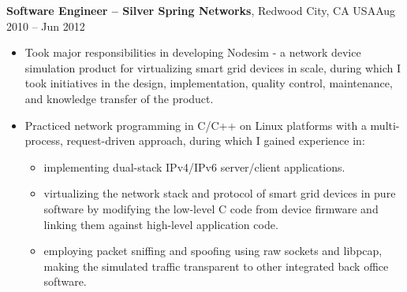\documentclass[margin,line]{res}
\begin{document}
\begin{resume}
  {\bf Software Engineer -- Silver Spring Networks}, Redwood City, CA USA\hfill Aug 2010 -- Jun 2012
  \vspace{.05in}
  \begin{itemize}
  \item Took major responsibilities in developing Nodesim - a network device
        simulation product for virtualizing smart grid devices in scale,
        during which I took initiatives in the design, implementation,
        quality control, maintenance, and knowledge transfer of the product.
  \item Practiced network programming in C/C++ on Linux platforms with a
        multi-process, request-driven approach, during which I gained
        experience in:
        \begin{itemize}
        \item implementing dual-stack IPv4/IPv6 server/client applications.
        \item virtualizing the network stack and protocol of smart grid devices
              in pure software by modifying the low-level C code from device
              firmware and linking them against high-level application code.
        \item employing packet sniffing and spoofing using raw sockets and
              libpcap, making the simulated traffic transparent to other
              integrated back office software.
        \end{itemize}
  \end{itemize}


\end{resume}
\end{document}
